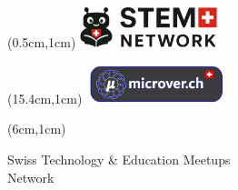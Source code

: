 \documentclass[10pt]{article}
\begin{document}
\begin{textblock*}{5cm}(0.5cm,1cm) %
	\href{https://stem-network.org}{\includegraphics[width=4cm]{stem-network.png}}
\end{textblock*}

\begin{textblock*}{5cm}(15.4cm,1cm) %
	\href{https://microver.ch}{\includegraphics[width=4cm]{microver.png}} 
\end{textblock*}

\begin{textblock*}{9cm}(6cm,1cm) %
	\begin{center}
		Swiss Technology \& Education Meetups \\
		Network
	\end{center}
\end{textblock*}

\vspace*{0.3cm}
\end{document}
